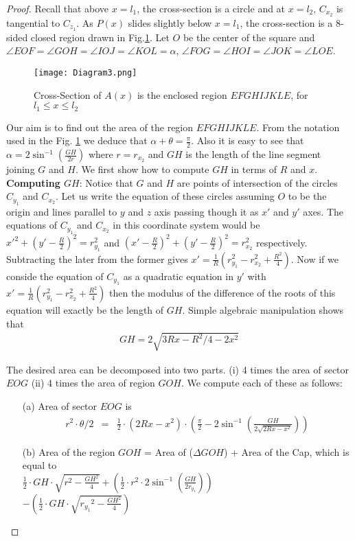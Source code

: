 \documentclass[conference]{IEEEtran}
\begin{document}
\begin{proof}
Recall that above $x = l_1$, the cross-section is a circle and at $x = l_2$,  $C_{x_2}$ is tangential to $C_{z_1}$. As $P(x)$
slides slightly below $x = l_1$, the cross-section is a 8-sided closed region drawn in Fig.\ref{z2}. Let $O$
be the center of the square and $\angle EOF =\angle GOH = \angle IOJ = \angle KOL = \alpha$, $\angle FOG = \angle HOI = \angle
JOK = \angle LOE$.
\begin{figure}
\centering
\texttt{[image: Diagram3.png]}
\caption{Cross-Section of $A(x)$ is the enclosed region $EFGHIJKLE$, for $l_1 \leq x \leq l_2$}
\label{z2}
\end{figure}
Our aim is to find out the area of  the region $EFGHIJKLE$. From the notation used in the Fig. \ref{z2} we deduce that
$\alpha + \theta = \frac{\pi}{2}$. Also it is easy to see that $\alpha = 2 \sin^{-1} \left(\frac{GH}{2r}\right)$ where $r = r_{x_2}$ and
$GH$ is the length of the line segment joining $G$ and $H$. We first show how to compute $GH$ in terms of $R$ and $x$. \\
\textbf{Computing $GH$}:
Notice that $G$ and $H$ are points of intersection of the circles $C_{y_1}$ and $C_{x_2}$. Let us write the equation
of these circles assuming $O$ to be the origin and lines parallel to $y$ and $z$ axis passing though it as $x'$ and $y'$ axes.
The equations of $C_{y_1}$ and $C_{x_2}$ in this coordinate system would be $x'^{2} + (y'-\frac{R}{2})^{2} = r_{y_1}^2$ and
$ (x'-\frac{R}{2})^{2} +  (y'-\frac{R}{2})^{2} = r_{x_2}^2$ respectively. Subtracting the later from the former gives
$x' = \frac{1}{R}\left(r_{y_1}^2 - r_{x_2}^2 + \frac{R^2}{4} \right)$. Now if we conside the equation of $C_{y_1}$
as a quadratic equation in $y'$ with $x' = \frac{1}{R}\left(r_{y_1}^2 - r_{x_2}^2 + \frac{R^2}{4} \right)$ then the modulus of the difference of the
roots of this equation will exactly be the length of $GH$. Simple algebraic manipulation shows that
\begin{eqnarray*}
GH = 2\sqrt{3Rx - R^2/4 - 2x^2}
\end{eqnarray*}

The desired area can be decomposed into two parts. (i) 4 times the area
of sector $EOG$ (ii) 4 times the area of region $GOH$. We compute each of these as follows:
\begin{itemize}
\item[(a)] Area of sector $EOG$ is
\small
\begin{eqnarray*}
r^2 \cdot \theta/2 &=& \frac{1}{2} \cdot \left(2Rx - x^2 \right) \cdot \left( \frac{\pi}{2} - 2 \sin^{-1} \left( \frac{GH}{2\sqrt{2Rx - x^2}}\right) \right)
\end{eqnarray*}
\item[(b)] Area of the region $GOH$ =  Area of ($\Delta GOH$) + Area of the Cap, which is equal to \\
$\frac{1}{2}\cdot GH \cdot \sqrt{r^2 - \frac{GH^2}{4}} + \left( \frac{1}{2}\cdot r^2 \cdot 2 \sin^{-1}\left( \frac{GH}{2r_{y_1}}\right) \right)$ \\
$- \left(\frac{1}{2}\cdot GH \cdot  \sqrt{{r_{y_1}}^2 - \frac{GH^2}{4}}\right)$


\end{itemize}
\end{proof}
\end{document}
